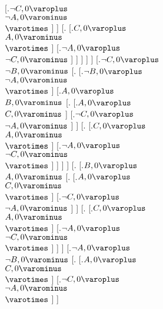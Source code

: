 [.{$\neg C, 0\varoplus $ \\ $\neg A, 0\varominus $ \\ $ \varotimes  $}  ]  ] 
[.{} [.{$C, 0\varoplus $ \\ $A, 0\varominus $ \\ $ \varotimes  $}  ] 
[.{$\neg A, 0\varoplus $ \\ $\neg C, 0\varominus $}  ]  ]  ]  ]  ] 
[.{$\neg C, 0\varoplus $ \\ $\neg B, 0\varominus $} [.{} [.{$\neg B, 0\varoplus $ \\ $\neg A, 0\varominus $ \\ $ \varotimes  $}  ] 
[.{$A, 0\varoplus $ \\ $B, 0\varominus $} [.{} [.{$A, 0\varoplus $ \\ $C, 0\varominus $}  ] 
[.{$\neg C, 0\varoplus $ \\ $\neg A, 0\varominus $}  ]  ] 
[.{} [.{$C, 0\varoplus $ \\ $A, 0\varominus $ \\ $ \varotimes  $}  ] 
[.{$\neg A, 0\varoplus $ \\ $\neg C, 0\varominus $ \\ $ \varotimes  $}  ]  ]  ]  ] 
[.{} [.{$B, 0\varoplus $ \\ $A, 0\varominus $} [.{} [.{$A, 0\varoplus $ \\ $C, 0\varominus $ \\ $ \varotimes  $}  ] 
[.{$\neg C, 0\varoplus $ \\ $\neg A, 0\varominus $}  ]  ] 
[.{} [.{$C, 0\varoplus $ \\ $A, 0\varominus $ \\ $ \varotimes  $}  ] 
[.{$\neg A, 0\varoplus $ \\ $\neg C, 0\varominus $ \\ $ \varotimes  $}  ]  ]  ] 
[.{$\neg A, 0\varoplus $ \\ $\neg B, 0\varominus $} [.{} [.{$A, 0\varoplus $ \\ $C, 0\varominus $ \\ $ \varotimes  $}  ] 
[.{$\neg C, 0\varoplus $ \\ $\neg A, 0\varominus $ \\ $ \varotimes  $}  ]  ] 
